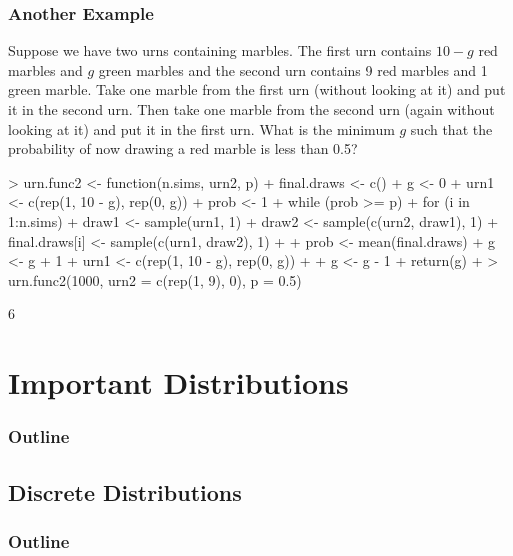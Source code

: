 \documentclass[handout]{beamer}
\begin{document}
\begin{frame}[fragile]
\frametitle{Another Example}
\pause
\small
Suppose we have two urns containing marbles.  The first urn contains $10-g$
red marbles and $g$ green marbles and the second urn contains 9 red
marbles and 1 green marble.  Take one marble from the first urn
(without looking at it) and put it in the second urn.  Then take one
marble from the second urn (again without looking at it) and put it in
the first urn.  What is the minimum $g$ such that the probability of
now drawing a red marble is less than 0.5?
\pause
\medskip
\tiny
\begin{Schunk}
\begin{Sinput}
> urn.func2 <- function(n.sims, urn2, p) {
+     final.draws <- c()
+     g <- 0
+     urn1 <- c(rep(1, 10 - g), rep(0, g))
+     prob <- 1
+     while (prob >= p) {
+         for (i in 1:n.sims) {
+             draw1 <- sample(urn1, 1)
+             draw2 <- sample(c(urn2, draw1), 1)
+             final.draws[i] <- sample(c(urn1, draw2), 1)
+         }
+         prob <- mean(final.draws)
+         g <- g + 1
+         urn1 <- c(rep(1, 10 - g), rep(0, g))
+     }
+     g <- g - 1
+     return(g)
+ }
> urn.func2(1000, urn2 = c(rep(1, 9), 0), p = 0.5)
\end{Sinput}
\begin{Soutput}
[1] 6
\end{Soutput}
\end{Schunk}
\normalsize
\end{frame}

\section{Important Distributions}


\begin{frame}
\frametitle{Outline}
\tableofcontents[currentsection]
\end{frame}

\subsection{Discrete Distributions}


\begin{frame}
\frametitle{Outline}
\tableofcontents[currentsubsection]
\end{frame}
\end{document}
